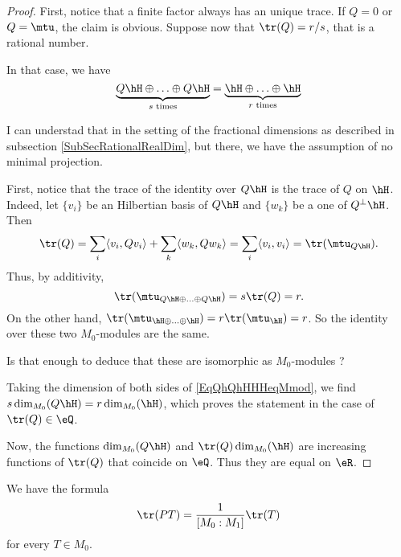 \begin{proof}
First, notice that a finite factor always has an unique trace. If $Q=0$ or $Q=\mtu$, the claim is obvious. Suppose now that $\tr(Q)=r/s$, that is a rational number.

In that case, we have
\begin{equation}		 \label{EqQhQhHHHeqMmod}
	\underbrace{Q\hH\oplus\ldots\oplus Q\hH}_{\text{$s$ times}} =\underbrace{\hH\oplus\ldots\oplus \hH}_{\text{$r$ times}} 
\end{equation}
\begin{probleme}
I can understad that in the setting of the fractional dimensions as described in subsection \ref{SubSecRationalRealDim}, but there, we have the assumption of no minimal projection.
\end{probleme}
First, notice that the trace of the identity over $Q\hH$ is the trace of $Q$ on $\hH$. Indeed, let $\{ v_i \}$ be an Hilbertian basis of $Q\hH$ and $\{ w_k \}$ be a one of $Q^{\perp}\hH$. Then
\begin{equation}	
	\tr(Q)=\sum_i\langle v_i, Qv_i\rangle +\sum_k\langle w_k, Qw_k\rangle =\sum_i\langle v_i, v_i\rangle =\tr(\mtu_{Q\hH}).
\end{equation}
Thus, by additivity, 
\begin{equation}
	\tr(\mtu_{Q\hH\oplus\ldots\oplus Q\hH})=s\tr(Q)=r.
\end{equation}
On the other hand, $\tr(\mtu_{\hH\oplus\ldots\oplus\hH})=r\tr(\mtu_{\hH})=r$. So the identity over these two $M_0$-modules are the same.
\begin{probleme}
Is that enough to deduce that these are isomorphic as $M_0$-modules ?
\end{probleme}
Taking the dimension of both sides of \eqref{EqQhQhHHHeqMmod}, we find $s\dim_{M_0}(Q\hH)=r\dim_{M_0}(\hH)$, which proves the statement in the case of $\tr(Q)\in\eQ$.

Now, the functions $\dim_{M_0}(Q\hH)$ and $\tr(Q)\dim_{M_0}(\hH)$ are increasing functions of $\tr(Q)$ that coincide on $\eQ$. Thus they are equal on $\eR$.

\end{proof}



\begin{proposition}		\label{ProptrPTMNtrT}
We have the formula
\begin{equation}		\label{EqClaimLemPTfracMNtrT}
	\tr(PT)=\frac{1}{ [M_0:M_1] }\tr(T)
\end{equation}
for every $T\in M_0$.
\end{proposition}


